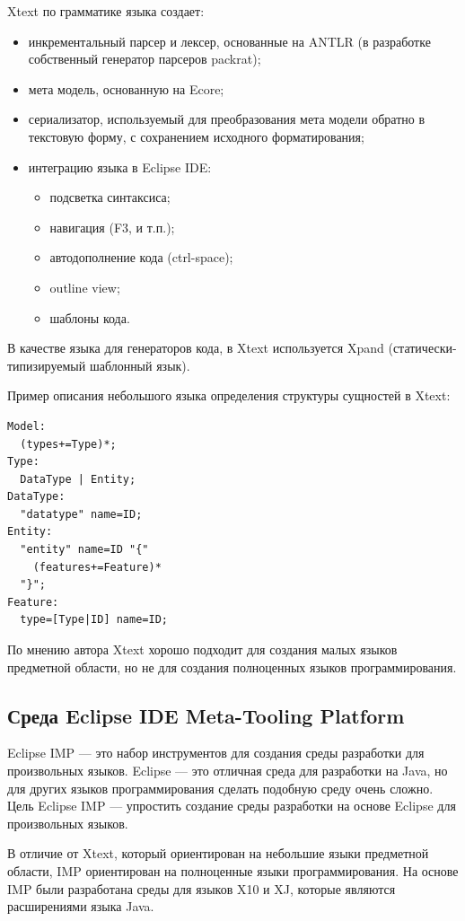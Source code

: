 \documentclass[a4paper,12pt,titlepage]{extarticle}
\begin{document}
Xtext по грамматике языка создает:
\begin{itemize}
  \item инкрементальный парсер и лексер, основанные на ANTLR (в разработке
  собственный генератор парсеров packrat);
  \item мета модель, основанную на Ecore;
  \item сериализатор, используемый для преобразования мета модели обратно в
  текстовую форму, с сохранением исходного форматирования; 
  \item интеграцию языка в Eclipse IDE:
  \begin{itemize}
    \item подсветка синтаксиса;
    \item навигация (F3, и т.п.);
    \item автодополнение кода (ctrl-space);
    \item outline view;
    \item шаблоны кода.
  \end{itemize}
\end{itemize}

В качестве языка для генераторов кода, в Xtext используется Xpand
(статически-типизируемый шаблонный язык).

Пример описания небольшого языка определения структуры сущностей в Xtext:
\begin{verbatim}
Model:
  (types+=Type)*;
Type:
  DataType | Entity;
DataType:
  "datatype" name=ID;
Entity:
  "entity" name=ID "{"
    (features+=Feature)* 
  "}";
Feature:
  type=[Type|ID] name=ID;   
\end{verbatim}

По мнению автора Xtext хорошо подходит для создания малых языков предметной
области, но не для создания полноценных языков программирования.

\subsection{Среда Eclipse IDE Meta-Tooling Platform}
\label{imp}
Eclipse IMP --- это набор инструментов для создания среды разработки для
произвольных языков.
Eclipse --- это отличная среда для разработки на Java, но для
других языков программирования сделать подобную среду очень сложно. Цель
Eclipse IMP --- упростить создание среды разработки на основе Eclipse для
произвольных языков.

В отличие от Xtext, который ориентирован на небольшие языки предметной области,
IMP ориентирован на полноценные языки программирования. На основе IMP
были разработана среды для языков X10 и XJ, которые являются расширениями
языка Java.
\end{document}
